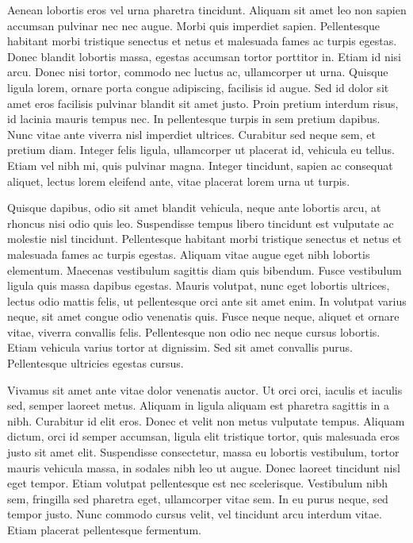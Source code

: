 Aenean lobortis eros vel urna pharetra tincidunt.
Aliquam sit amet leo non sapien accumsan pulvinar nec nec augue.
Morbi quis imperdiet sapien.
Pellentesque habitant morbi tristique senectus et netus et malesuada fames ac turpis egestas.
Donec blandit lobortis massa, egestas accumsan tortor porttitor in.
Etiam id nisi arcu.
Donec nisi tortor, commodo nec luctus ac, ullamcorper ut urna.
Quisque ligula lorem, ornare porta congue adipiscing, facilisis id augue.
Sed id dolor sit amet eros facilisis pulvinar blandit sit amet justo.
Proin pretium interdum risus, id lacinia mauris tempus nec.
In pellentesque turpis in sem pretium dapibus.
Nunc vitae ante viverra nisl imperdiet ultrices.
Curabitur sed neque sem, et pretium diam.
Integer felis ligula, ullamcorper ut placerat id, vehicula eu tellus.
Etiam vel nibh mi, quis pulvinar magna.
Integer tincidunt, sapien ac consequat aliquet, lectus lorem eleifend ante, vitae placerat lorem urna ut turpis.

Quisque dapibus, odio sit amet blandit vehicula, neque ante lobortis arcu, at rhoncus nisi odio quis leo.
Suspendisse tempus libero tincidunt est vulputate ac molestie nisl tincidunt.
Pellentesque habitant morbi tristique senectus et netus et malesuada fames ac turpis egestas.
Aliquam vitae augue eget nibh lobortis elementum.
Maecenas vestibulum sagittis diam quis bibendum.
Fusce vestibulum ligula quis massa dapibus egestas.
Mauris volutpat, nunc eget lobortis ultrices, lectus odio mattis felis, ut pellentesque orci ante sit amet enim.
In volutpat varius neque, sit amet congue odio venenatis quis.
Fusce neque neque, aliquet et ornare vitae, viverra convallis felis.
Pellentesque non odio nec neque cursus lobortis.
Etiam vehicula varius tortor at dignissim.
Sed sit amet convallis purus.
Pellentesque ultricies egestas cursus.

Vivamus sit amet ante vitae dolor venenatis auctor.
Ut orci orci, iaculis et iaculis sed, semper laoreet metus.
Aliquam in ligula aliquam est pharetra sagittis in a nibh.
Curabitur id elit eros.
Donec et velit non metus vulputate tempus.
Aliquam dictum, orci id semper accumsan, ligula elit tristique tortor, quis malesuada eros justo sit amet elit.
Suspendisse consectetur, massa eu lobortis vestibulum, tortor mauris vehicula massa, in sodales nibh leo ut augue.
Donec laoreet tincidunt nisl eget tempor.
Etiam volutpat pellentesque est nec scelerisque.
Vestibulum nibh sem, fringilla sed pharetra eget, ullamcorper vitae sem.
In eu purus neque, sed tempor justo.
Nunc commodo cursus velit, vel tincidunt arcu interdum vitae.
Etiam placerat pellentesque fermentum.

